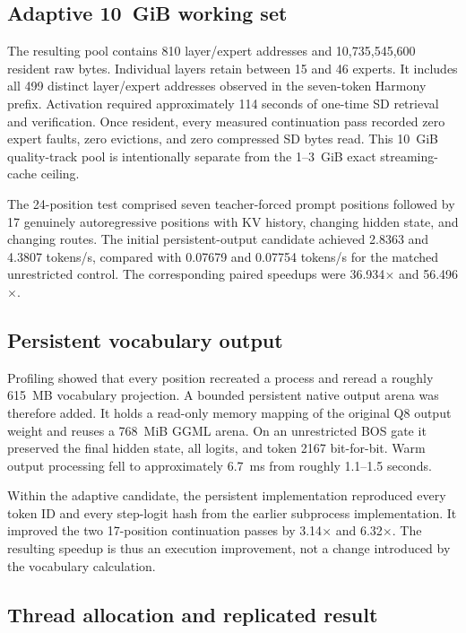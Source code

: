 \subsection{Adaptive 10~GiB working set}

The resulting pool contains 810 layer/expert addresses and
10,735,545,600 resident raw bytes.  Individual layers retain between 15 and 46
experts.  It includes all 499 distinct layer/expert addresses observed in the
seven-token Harmony prefix.  Activation required approximately 114 seconds of
one-time SD retrieval and verification.  Once resident, every measured
continuation pass recorded zero expert faults, zero evictions, and zero
compressed SD bytes read.  This 10~GiB quality-track pool is intentionally
separate from the 1--3~GiB exact streaming-cache ceiling.

The 24-position test comprised seven teacher-forced prompt positions followed
by 17 genuinely autoregressive positions with KV history, changing hidden
state, and changing routes.  The initial persistent-output candidate achieved
2.8363 and 4.3807 tokens/s, compared with 0.07679 and 0.07754 tokens/s for the
matched unrestricted control.  The corresponding paired speedups were
36.934$\times$ and 56.496$\times$.

\subsection{Persistent vocabulary output}

Profiling showed that every position recreated a process and reread a roughly
615~MB vocabulary projection.  A bounded persistent native output arena was
therefore added.  It holds a read-only memory mapping of the original Q8 output
weight and reuses a 768~MiB GGML arena.  On an unrestricted BOS gate it
preserved the final hidden state, all logits, and token 2167 bit-for-bit.  Warm
output processing fell to approximately 6.7~ms from roughly 1.1--1.5 seconds.

Within the adaptive candidate, the persistent implementation reproduced every
token ID and every step-logit hash from the earlier subprocess implementation.
It improved the two 17-position continuation passes by 3.14$\times$ and
6.32$\times$.  The resulting speedup is thus an execution improvement, not a
change introduced by the vocabulary calculation.

\subsection{Thread allocation and replicated result}

